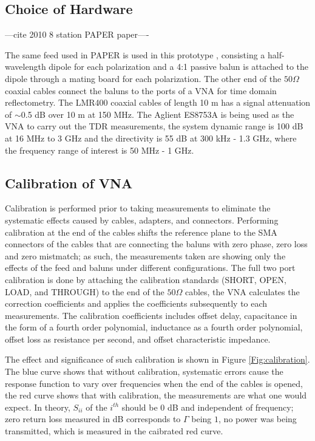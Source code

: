 \documentclass[preprint]{aastex}  %
\begin{document}
\subsection{Choice of Hardware}
---cite 2010 8 station PAPER paper----

The same feed used in PAPER is used in this prototype , consisting a half-wavelength dipole for each polarization and a 4:1 passive balun is attached to the dipole through a mating board for each polarization. The other end of the $50\Omega$ coaxial cables connect the baluns to the ports of a VNA for time domain reflectometry. The LMR400 coaxial cables of length 10 m has a signal attenuation of $\sim$0.5 dB over 10 m at 150 MHz. The Aglient ES8753A is being used as the VNA to carry out the TDR measurements, the system dynamic range is 100 dB at 16 MHz to 3 GHz and the directivity is 55 dB at 300 kHz - 1.3 GHz, where the frequency range of interest is 50 MHz - 1 GHz. 

\subsection{Calibration of VNA}
Calibration is performed prior to taking measurements to eliminate the systematic effects caused by cables, adapters, and connectors. Performing calibration at the end of the cables shifts the reference plane to the SMA connectors of the cables that are connecting the baluns with zero phase, zero loss and zero mistmatch; as such, the measurements taken are showing only the effects of the feed and baluns under different configurations. The full two port calibration is done by attaching the calibration standards (SHORT, OPEN, LOAD, and THROUGH) to the end of the $50\Omega$ cables, the VNA calculates the correction coefficients and applies the coefficients subsequently to each measurements. The calibration coefficients includes offset delay, capacitance in the form of a fourth order polynomial, inductance as a fourth order polynomial, offset loss as resistance per second, and offset characteristic impedance. 

The effect and significance of such calibration is shown in Figure \ref{Fig:calibration}. The blue 
curve shows that without calibration, systematic errors 
cause the response function to vary over frequencies when the end of the cables 
is opened, the red curve shows that with calibration, the 
measurements are what one would expect. In theory, $S_{ii}$ of the $i^{th}$ should be $0$ dB and independent of frequency; zero return loss measured in dB corresponds to $\Gamma$ being $1$, no power was being transmitted, which is measured in the caibrated red curve. 
\end{document}
